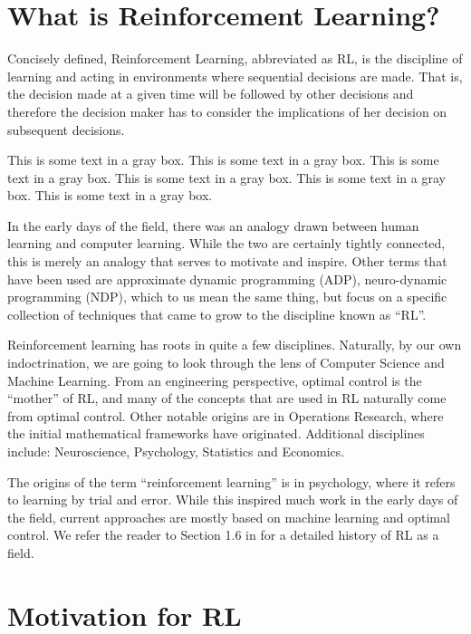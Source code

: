 \section{What is Reinforcement Learning?}

Concisely defined, Reinforcement Learning, abbreviated as RL, is the discipline of learning and acting in 
environments where sequential decisions are made. That is, the decision made at a given time 
will be followed by other decisions and therefore the decision maker has to consider the implications 
of her decision on subsequent decisions. 

\begin{commentary}
This is some text in a gray box. This is some text in a gray box. This is some text in a gray box. 
This is some text in a gray box. This is some text in a gray box. This is some text in a gray box.
\end{commentary}


In the early days of the field, there was an analogy drawn between human learning and computer 
learning. While the two are certainly tightly connected, this is merely an analogy that serves to motivate and inspire. Other terms that 
have been used are approximate dynamic programming (ADP), neuro-dynamic programming (NDP), which to us
mean the same thing, but focus on a specific collection of techniques that came to grow to the discipline known as ``RL''.

 \medskip
{}
%
Reinforcement learning has roots in quite a few disciplines.
Naturally, by our own indoctrination, we are going to look through the lens of Computer Science
and Machine Learning. From an engineering perspective, optimal control is 
the ``mother'' of RL, and many of the concepts that are used in RL naturally come from optimal control. 
Other notable origins are in Operations Research, where the initial mathematical frameworks have originated.
Additional disciplines include: Neuroscience, Psychology, Statistics and
Economics.

The origins of the term ``reinforcement learning'' is in psychology, where it refers to learning by trial and error. 
While this inspired much work in the early days of the field, current approaches are mostly based on
machine learning and optimal control. We refer the reader to Section 1.6 in \cite{SuttonB98} for 
a detailed history of RL as a field. 

\section{Motivation for RL}

